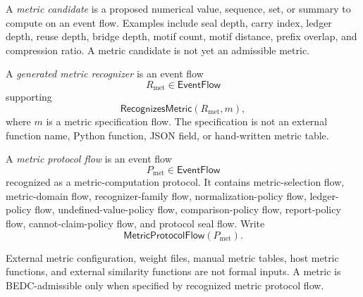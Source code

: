\begin{definition}
\label{def:metric-report-candidate}
A \emph{metric candidate} is a proposed numerical value, sequence, set, or summary to compute on an event flow. Examples include seal depth, carry index, ledger depth, reuse depth, bridge depth, motif count, motif distance, prefix overlap, and compression ratio. A metric candidate is not yet an admissible metric.
\end{definition}

\begin{definition}
\label{def:metric-report-generated-metric-recognizer}
A \emph{generated metric recognizer} is an event flow
$$
  R_{\mathrm{met}}\in\mathsf{EventFlow}
$$
supporting
$$
  \mathsf{RecognizesMetric}(R_{\mathrm{met}},m),
$$
where $m$ is a metric specification flow. The specification is not an external function name, Python function, JSON field, or hand-written metric table.
\end{definition}

\begin{definition}
\label{def:metric-report-protocol-flow}
A \emph{metric protocol flow} is an event flow
$$
  P_{\mathrm{met}}\in\mathsf{EventFlow}
$$
recognized as a metric-computation protocol. It contains metric-selection flow, metric-domain flow, recognizer-family flow, normalization-policy flow, ledger-policy flow, undefined-value-policy flow, comparison-policy flow, report-policy flow, cannot-claim-policy flow, and protocol seal flow. Write
$$
  \mathsf{MetricProtocolFlow}(P_{\mathrm{met}}).
$$
\end{definition}

\begin{principle}
\label{prin:metric-report-no-metric-without-protocol}
External metric configuration, weight files, manual metric tables, host metric functions, and external similarity functions are not formal inputs. A metric is BEDC-admissible only when specified by recognized metric protocol flow.
\end{principle}

